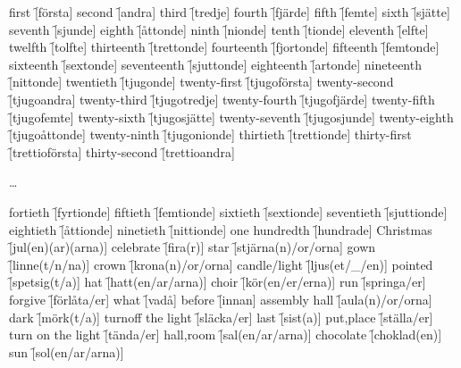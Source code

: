 \begin{questions}
    \begin{multicols}{2}
        \raggedcolumns
        \question first \f[första]
        \question second \f[andra]
        \question third \f[tredje]
        \question fourth \f[fjärde]
        \question fifth \f[femte]
        \question sixth \f[sjätte]
        \question seventh \f[sjunde]
        \question eighth \f[åttonde]
        \question ninth \f[nionde]
        \question tenth \f[tionde]
        \question eleventh \f[elfte]
        \question twelfth \f[tolfte]
        \question thirteenth \f[trettonde]
        \question fourteenth \f[fjortonde]
        \question fifteenth \f[femtonde]
        \question sixteenth \f[sextonde]
        \question seventeenth \f[sjuttonde]
        \question eighteenth \f[artonde]
        \question nineteenth \f[nittonde]
        \question twentieth \f[tjugonde]
        \question twenty-first \f[tjugoförsta]
        \question twenty-second \f[tjugoandra]
        \question twenty-third \f[tjugotredje]
        \question twenty-fourth \f[tjugofjärde]
        \question twenty-fifth \f[tjugofemte]
        \question twenty-sixth \f[tjugosjätte]
        \question twenty-seventh \f[tjugosjunde]
        \question twenty-eighth \f[tjugoåttonde]
        \question twenty-ninth \f[tjugonionde]
        \question thirtieth \f[trettionde]
        \question thirty-first \f[trettioförsta]
        \question thirty-second \f[trettioandra]

        \ldots

        \question fortieth \f[fyrtionde]
        \question fiftieth \f[femtionde]
        \question sixtieth \f[sextionde]
        \question seventieth \f[sjuttionde]
        \question eightieth \f[åttionde]
        \question ninetieth \f[nittionde]
        \question one hundredth \f[hundrade]
        \question Christmas \f[jul(en)(ar)(arna)]
        \question celebrate \f[fira(r)]
        \question star \f[stjärna(n)/or/orna]
        \question gown \f[linne(t/n/na)]
        \question crown \f[krona(n)/or/orna]
        \question candle/light \f[ljus(et/\_/en)]
        \question pointed \f[spetsig(t/a)]
        \question hat \f[hatt(en/ar/arna)]
        \question choir \f[kör(en/er/erna)]
        \question run \f[springa/er]
        \question forgive \f[förlåta/er]
        \question what \f[vadå]
        \question before \f[innan]
        \question assembly hall \f[aula(n)/or/orna]
        \question dark \f[mörk(t/a)]
        \question turnoff the light \f[släcka/er]
        \question last \f[sist(a)]
        \question put,place \f[ställa/er]
        \question turn on the light \f[tända/er]
        \question hall,room \f[sal(en/ar/arna)]
        \question chocolate \f[choklad(en)]
        \question sun \f[sol(en/ar/arna)]
    \end{multicols}
\end{questions}

